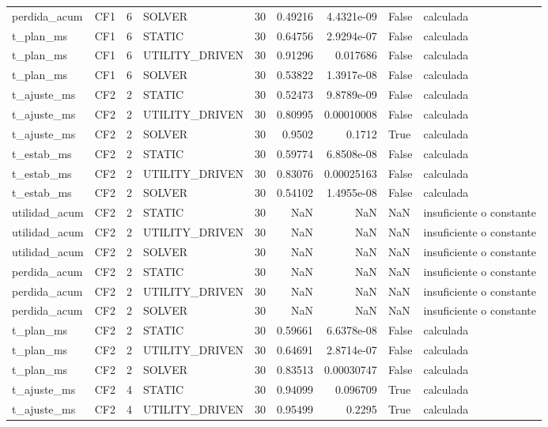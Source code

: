 \begin{tabular}{llrlrrrll}
perdida_acum & CF1 & 6 & SOLVER & 30 & 0.49216 & 4.4321e-09 & False & calculada \\
t_plan_ms & CF1 & 6 & STATIC & 30 & 0.64756 & 2.9294e-07 & False & calculada \\
t_plan_ms & CF1 & 6 & UTILITY_DRIVEN & 30 & 0.91296 & 0.017686 & False & calculada \\
t_plan_ms & CF1 & 6 & SOLVER & 30 & 0.53822 & 1.3917e-08 & False & calculada \\
t_ajuste_ms & CF2 & 2 & STATIC & 30 & 0.52473 & 9.8789e-09 & False & calculada \\
t_ajuste_ms & CF2 & 2 & UTILITY_DRIVEN & 30 & 0.80995 & 0.00010008 & False & calculada \\
t_ajuste_ms & CF2 & 2 & SOLVER & 30 & 0.9502 & 0.1712 & True & calculada \\
t_estab_ms & CF2 & 2 & STATIC & 30 & 0.59774 & 6.8508e-08 & False & calculada \\
t_estab_ms & CF2 & 2 & UTILITY_DRIVEN & 30 & 0.83076 & 0.00025163 & False & calculada \\
t_estab_ms & CF2 & 2 & SOLVER & 30 & 0.54102 & 1.4955e-08 & False & calculada \\
utilidad_acum & CF2 & 2 & STATIC & 30 & NaN & NaN & NaN & insuficiente o constante \\
utilidad_acum & CF2 & 2 & UTILITY_DRIVEN & 30 & NaN & NaN & NaN & insuficiente o constante \\
utilidad_acum & CF2 & 2 & SOLVER & 30 & NaN & NaN & NaN & insuficiente o constante \\
perdida_acum & CF2 & 2 & STATIC & 30 & NaN & NaN & NaN & insuficiente o constante \\
perdida_acum & CF2 & 2 & UTILITY_DRIVEN & 30 & NaN & NaN & NaN & insuficiente o constante \\
perdida_acum & CF2 & 2 & SOLVER & 30 & NaN & NaN & NaN & insuficiente o constante \\
t_plan_ms & CF2 & 2 & STATIC & 30 & 0.59661 & 6.6378e-08 & False & calculada \\
t_plan_ms & CF2 & 2 & UTILITY_DRIVEN & 30 & 0.64691 & 2.8714e-07 & False & calculada \\
t_plan_ms & CF2 & 2 & SOLVER & 30 & 0.83513 & 0.00030747 & False & calculada \\
t_ajuste_ms & CF2 & 4 & STATIC & 30 & 0.94099 & 0.096709 & True & calculada \\
t_ajuste_ms & CF2 & 4 & UTILITY_DRIVEN & 30 & 0.95499 & 0.2295 & True & calculada \\

\end{tabular}
